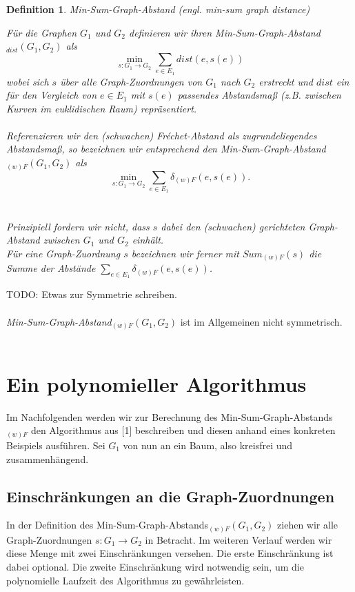\documentclass[a4paper, 12pt, twoside]{article}
\theoremstyle{Format1} %
\newtheorem{Def}{Definition}[section]       %
\begin{document}
\begin{Def} \label{Definition Min-Sum}
	Min-Sum-Graph-Abstand (engl. min-sum graph distance)

	Für die Graphen $G_1$ und $G_2$ definieren wir ihren \textit{Min-Sum-Graph-Abstand}$_{dist}(G_1, G_2)$ als
	$$\min_{s: G_1 \to G_2} \sum_{e \in E_1} dist(e, s(e))$$
	wobei sich $s$ über alle Graph-Zuordnungen von $G_1$ nach $G_2$ erstreckt und $dist$ ein für den Vergleich von $e \in E_1$ mit $s(e)$
	passendes Abstandsmaß (z.B. zwischen Kurven im euklidischen Raum) repräsentiert.
	\\
	\\
	Referenzieren wir den (schwachen) Fréchet-Abstand als zugrundeliegendes Abstandsmaß, so bezeichnen wir entsprechend den \textit{Min-Sum-Graph-Abstand}$_{(w)F}(G_1, G_2)$ als
	$$\min_{s: G_1 \to G_2} \sum_{e \in E_1} \delta_{(w)F}(e, s(e)).$$
	\\
	\\
	Prinzipiell fordern wir nicht, dass $s$ dabei den (schwachen) gerichteten Graph-Abstand zwischen $G_1$ und $G_2$ einhält.
	\\
	Für eine Graph-Zuordnung $s$ bezeichnen wir ferner mit $Sum_{(w)F}(s)$ die Summe der Abstände $\sum_{e \in E_1}\delta_{(w)F}(e, s(e))$.
	\\

\end{Def}

TODO: Etwas zur Symmetrie schreiben.
\\
\\
\textit{Min-Sum-Graph-Abstand}$_{(w)F}(G_1, G_2)$ ist im Allgemeinen nicht symmetrisch.
\\
\\

\section{Ein polynomieller Algorithmus}

Im Nachfolgenden werden wir zur Berechnung des Min-Sum-Graph-Abstands$_{(w)F}$ den Algorithmus aus [1] beschreiben und diesen anhand eines konkreten Beispiels ausführen.
Sei $G_1$ von nun an ein Baum, also kreisfrei und zusammenhängend.

\subsection{Einschränkungen an die Graph-Zuordnungen} \label{Einschränkungen}
In der Definition des Min-Sum-Graph-Abstands$_{(w)F}(G_1, G_2)$ ziehen wir alle Graph-Zuordnungen $s: G_1 \to G_2$ in Betracht.
Im weiteren Verlauf werden wir diese Menge mit zwei Einschränkungen versehen.
Die erste Einschränkung ist dabei optional. Die zweite Einschränkung wird notwendig sein, um die polynomielle Laufzeit des Algorithmus zu gewährleisten.
\end{document}
